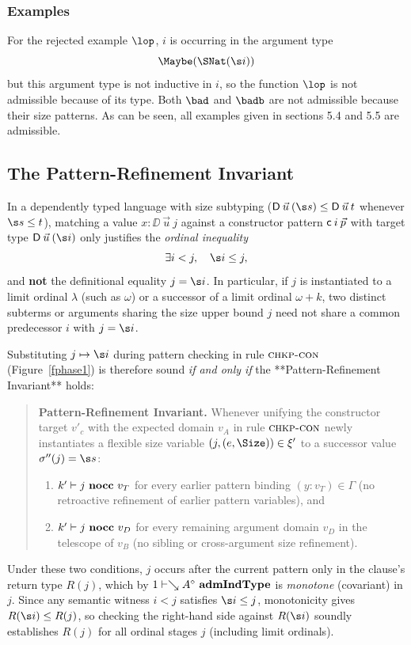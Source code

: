\subsubsection{Examples}

For the rejected example $\lop$, $i$ is occurring in the argument type \[\Maybe (\SNat (\s i))\] but this argument type is not inductive in $i$, so the function $\lop$ is not admissible because of its type.
Both $\bad$ and $\badb$ are not admissible because their size patterns. 
As can be seen, all examples given in sections 5.4 and 5.5 are admissible.

\subsection{The Pattern-Refinement Invariant}

In a dependently typed language with size subtyping ($\DD \: \vec{u} \: (\s s) \leq \DD \: \vec{u} \: t$ whenever $\s s \leq t$), matching a value $x : \DD \: \vec{u} \: j$ against a constructor pattern $\mathsf{c} \: i \: \vec{p}$ with target type $\DD \: \vec{u} \: (\s i)$ only justifies the \emph{ordinal inequality}
\[
  \exists i < j, \quad \s i \leq j,
\]
and \textbf{not} the definitional equality $j = \s i$.
In particular, if $j$ is instantiated to a limit ordinal $\lambda$ (such as $\omega$) or a successor of a limit ordinal $\omega + k$, two distinct subterms or arguments sharing the size upper bound $j$ need not share a common predecessor $i$ with $j = \s i$.

Substituting $j \mapsto \s i$ during pattern checking in rule $\mbox{\sc chkp-con}$ (Figure~\ref{fphase1}) is therefore sound \emph{if and only if} the **Pattern-Refinement Invariant** holds:
\begin{quote}
\textbf{Pattern-Refinement Invariant.}
Whenever unifying the constructor target $v'_c$ with the expected domain $v_A$ in rule $\mbox{\sc chkp-con}$ newly instantiates a flexible size variable $(j, (e, \Size)) \in \xi'$ to a successor value $\sigma''(j) = \s s$:
\begin{enumerate}
\item $k'\vdash j\mbox{ \textbf{nocc} }v_T$ for every earlier pattern binding $(y : v_T) \in \Gamma$ (no retroactive refinement of earlier pattern variables), and
\item $k'\vdash j\mbox{ \textbf{nocc} }v_D$ for every remaining argument domain $v_D$ in the telescope of $v_B$ (no sibling or cross-argument size refinement).
\end{enumerate}
\end{quote}
Under these two conditions, $j$ occurs after the current pattern only in the clause's return type $R(j)$, which by $1\vdash\searrow A^{\diamond}\mbox{ \textbf{admIndType}}$ is \emph{monotone} (covariant) in $j$. Since any semantic witness $i < j$ satisfies $\s i \leq j$, monotonicity gives $R(\s i) \leq R(j)$, so checking the right-hand side against $R(\s i)$ soundly establishes $R(j)$ for all ordinal stages $j$ (including limit ordinals).

